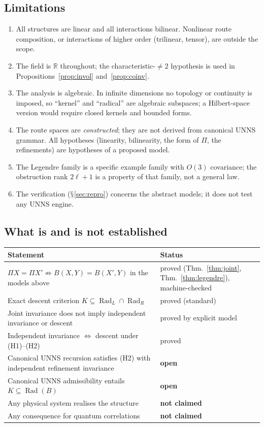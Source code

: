 \documentclass[11pt,a4paper]{article}
\renewcommand{\S}{\ensuremath{\mathsection}}
\newcommand{\RR}{\mathbb{R}}
\newcommand{\Rad}{\operatorname{Rad}}
\theoremstyle{plain}
\theoremstyle{definition}
\begin{document}
\subsection{Limitations}\label{sec:limits}
\begin{enumerate}[label=(L\arabic*)]
\item All structures are linear and all interactions bilinear. Nonlinear route composition, or interactions of higher order (trilinear, tensor), are outside the scope.
\item The field is $\RR$ throughout; the characteristic-$\neq2$ hypothesis is used in Propositions~\ref{prop:invol} and~\ref{prop:coinv}.
\item The analysis is algebraic. In infinite dimensions no topology or continuity is imposed, so ``kernel'' and ``radical'' are algebraic subspaces; a Hilbert-space version would require closed kernels and bounded forms.
\item The route spaces are \emph{constructed}; they are not derived from canonical UNNS grammar. All hypotheses (linearity, bilinearity, the form of $\Pi$, the refinements) are hypotheses of a proposed model.
\item The Legendre family is a specific example family with $O(3)$ covariance; the obstruction rank $2\ell+1$ is a property of that family, not a general law.
\item The verification (\S\ref{sec:repro}) concerns the abstract models; it does not test any UNNS engine.
\end{enumerate}

\subsection{What is and is not established}
\begin{center}\small
\begin{tabularx}{\textwidth}{@{}>{\raggedright\arraybackslash}X>{\raggedright\arraybackslash}p{}@{}}
\toprule
Statement & Status\\
\midrule
$\Pi X=\Pi X'\not\Rightarrow B(X,Y)=B(X',Y)$ in the models above & proved (Thm.~\ref{thm:joint}, Thm.~\ref{thm:legendre}), machine-checked\\
Exact descent criterion $K\subseteq\Rad_L\cap\Rad_R$ & proved (standard)\\
Joint invariance does not imply independent invariance or descent & proved by explicit model\\
Independent invariance $\Leftrightarrow$ descent under (H1)--(H2) & proved\\
Canonical UNNS recursion satisfies (H2) with independent refinement invariance & \textbf{open}\\
Canonical UNNS admissibility entails $K\subseteq\Rad(B)$ & \textbf{open}\\
Any physical system realises the structure & \textbf{not claimed}\\
Any consequence for quantum correlations & \textbf{not claimed}\\
\bottomrule
\end{tabularx}
\end{center}
\end{document}
